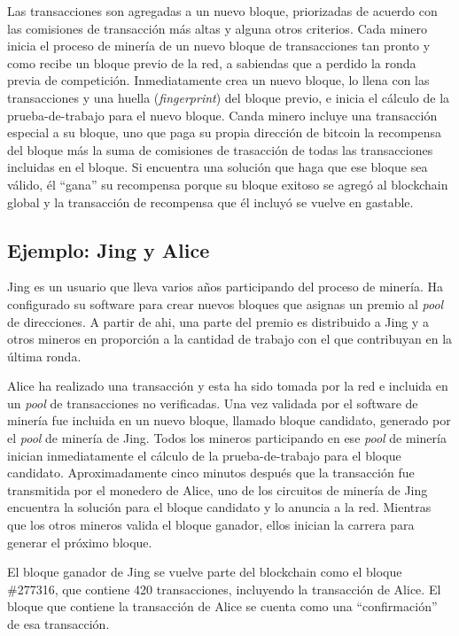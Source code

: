 \documentclass[10pt,journal,compsoc]{IEEEtran}
\begin{document}
Las transacciones son agregadas a un nuevo bloque, priorizadas de acuerdo con las comisiones de transacción más altas y alguna otros criterios. Cada minero inicia el proceso de minería de un nuevo bloque de transacciones tan pronto y como recibe un bloque previo de la red, a sabiendas que a perdido la ronda previa de competición. Inmediatamente crea un nuevo bloque, lo llena con las transacciones y una huella (\emph{fingerprint}) del bloque previo, e inicia el cálculo de la prueba-de-trabajo para el nuevo bloque. Canda minero incluye una transacción especial a su bloque, uno que paga su propia dirección de bitcoin la recompensa del bloque más la suma de comisiones de trasacción de todas las transacciones incluidas en el bloque. Si encuentra una solución que haga que ese bloque sea válido, él ``gana'' su recompensa porque su bloque exitoso se agregó al blockchain global y la transacción de recompensa que él incluyó se vuelve en gastable.

\subsection{Ejemplo: Jing y Alice}
Jing es un usuario que lleva varios años participando del proceso de minería. Ha configurado su software para crear nuevos bloques que asignas un premio al \emph{pool} de direcciones. A partir de ahi, una parte del premio es distribuido a Jing y a otros mineros en proporción a la cantidad de trabajo con el que contribuyan en la última ronda.

Alice ha realizado una transacción y esta ha sido tomada por la red e incluida en un \emph{pool} de transacciones no verificadas. Una vez validada por el software de minería fue incluida en un nuevo bloque, llamado bloque candidato, generado por el \emph{pool} de minería de Jing. Todos los mineros participando en ese \emph{pool} de minería inician inmediatamente el cálculo de la prueba-de-trabajo para el bloque candidato. Aproximadamente cinco minutos después que la transacción fue transmitida por el monedero de Alice, uno de los circuitos de minería de Jing encuentra la solución para el bloque candidato y lo anuncia a la red. Mientras que los otros mineros valida el bloque ganador, ellos inician la carrera para generar el próximo bloque.


El bloque ganador de Jing se vuelve parte del blockchain como el bloque \#277316, que contiene 420 transacciones, incluyendo la transacción de Alice. El bloque que contiene la transacción de Alice se cuenta como una ``confirmación'' de esa transacción.
\end{document}
